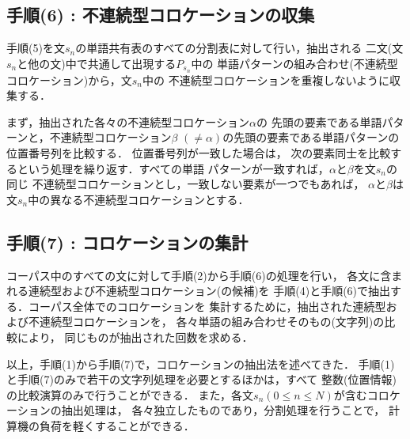\subsection*{手順(6) : 不連続型コロケーションの収集}

手順(5)を文\hspace{-0.1mm}$s_n$\hspace{-0.1mm}の単語共有表のすべての分割表に対して行い，抽出される
二文(文\hspace{-0.1mm}$s_n$\hspace{-0.1mm}と他の文)中で共通して出現する$P_{s_n}$中の
単語パターンの組み合わせ(不連続型コロケーション)から，文\hspace{-0.1mm}$s_n$\hspace{-0.1mm}中の
不連続型コロケーションを重複しないように収集する．

まず，抽出された各々の不連続型コロケーション$\alpha$の
先頭の要素である単語パターンと，不連続型コロケーション$\beta$
\((\neq \alpha)\)の先頭の要素である単語パターンの位置番号列を比較する．
位置番号列が一致した場合は，
次の要素同士を比較するという処理を繰り返す．すべての単語
パターンが一致すれば，\hspace{-0.2mm}$\alpha$\hspace{-0.1mm}と\hspace{-0.1mm}$\beta$\hspace{-0.1mm}を文\hspace{-0.1mm}$s_n$\hspace{-0.1mm}の同じ
不連続型コロケーションとし，一致しない要素が一つでもあれば，
$\alpha$と$\beta$は文\hspace{-0.1mm}$s_n$\hspace{-0.1mm}中の異なる不連続型コロケーションとする．

\vspace{-2mm}
\subsection*{手順(7) : コロケーションの集計}

コーパス中のすべての文に対して手順(2)から手順(6)の処理を行い，
各文に含まれる連続型および不連続型コロケーション(の候補)を
手順(4)と手順(6)で抽出する．コーパス全体でのコロケーションを
集計するために，抽出された連続型および不連続型コロケーションを，
各々単語の組み合わせそのもの(文字列)の比較により，
同じものが抽出された回数を求める．

\vspace{1zh}

以上，手順(1)から手順(7)で，コロケーションの抽出法を述べてきた．
手順(1)と手順(7)のみで若干の文字列処理を必要とするほかは，すべて
整数(位置情報)の比較演算のみで行うことができる．
また，各文$s_n$\((0\le n\le N)\)が含むコロケーションの抽出処理は，
各々独立したものであり，分割処理を行うことで，
計算機の負荷を軽くすることができる．

